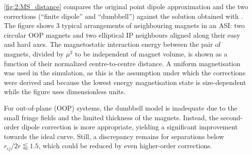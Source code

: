 \cref{fig:2:MS_distance} compares the original point dipole approximation and the two corrections (``finite dipole'' and ``dumbbell'') against the solution obtained with \mumax.
The figure shows 3 typical arrangements of neighbouring magnets in an ASI: two circular OOP magnets and two elliptical IP neighbours aligned along their easy and hard axes.
The magnetostatic interaction energy between the pair of magnets, divided by $\mu^2$ to be independent of magnet volume, is shown as a function of their normalized centre-to-centre distance.
A uniform magnetisation was used in the \mumax simulation, as this is the assumption under which the corrections were derived and because the lowest energy magnetisation state is size-dependent while the figure uses dimensionless units. \\\par


For out-of-plane (OOP) systems, the dumbbell model is inadequate due to the small fringe fields and the limited thickness of the magnets.
Instead, the second-order dipole correction is more appropriate, yielding a significant improvement towards the ideal \mumax curve.
Still, a discrepancy remains for separations below $r_{ij}/2r \lessapprox 1.5$, which could be reduced by even higher-order corrections. \\\par

